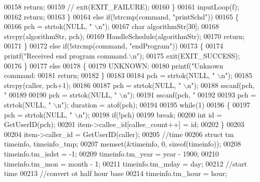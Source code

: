 \begin{DoxyCode}
{{{00158             \textcolor{keywordflow}{return};
00159             \textcolor{comment}{// exit(EXIT\_FAILURE);}
00160         \}
00161         inputLoop(f);
00162         \textcolor{keywordflow}{return};
00163     \}
00164     \textcolor{keywordflow}{else} \textcolor{keywordflow}{if}(!strcmp(command, \textcolor{stringliteral}{"printSchd"}))
00165     \{
00166         pch = strtok(NULL, \textcolor{stringliteral}{" \(\backslash\)n"});
00167         \textcolor{keywordtype}{char} algorithmStr[30];
00168         strcpy(algorithmStr, pch);
00169         HandleSchedule(algorithmStr);
00170         \textcolor{keywordflow}{return};
00171     \}
00172     \textcolor{keywordflow}{else} \textcolor{keywordflow}{if}(!strcmp(command, \textcolor{stringliteral}{"endProgram"}))
00173     \{
00174         printf(\textcolor{stringliteral}{"Received end program command.\(\backslash\)n"});
00175         exit(EXIT\_SUCCESS);
00176     \}
00177     \textcolor{keywordflow}{else}
00178     \{
00179         UNKNOWN:
00180         printf(\textcolor{stringliteral}{"Unknown command: %
00181         \textcolor{keywordflow}{return};
00182     \}
00183 
00184     pch = strtok(NULL, \textcolor{stringliteral}{" \(\backslash\)n"});
00185     strcpy(caller, pch+1);
00186 
00187     pch = strtok(NULL, \textcolor{stringliteral}{" \(\backslash\)n"});
00188     sscanf(pch, \textcolor{stringliteral}{"%
00189     
00190     pch = strtok(NULL, \textcolor{stringliteral}{" \(\backslash\)n"});
00191     sscanf(pch, \textcolor{stringliteral}{"%
00192     
00193     pch = strtok(NULL, \textcolor{stringliteral}{" \(\backslash\)n"}); duration = atof(pch);
00194 
00195     \textcolor{keywordflow}{while}(1)
00196     \{
00197         pch = strtok(NULL, \textcolor{stringliteral}{" \(\backslash\)n"});
00198         \textcolor{keywordflow}{if}(!pch)
00199             \textcolor{keywordflow}{break};
00200         \textcolor{keywordtype}{int} \textcolor{keywordtype}{id} = GetUserID(pch);
00201         item->callee_id[callee\_count++] = id;
00202     \}
00203 
00204     item->caller_id = GetUserID(caller);
00205     \textcolor{comment}{//time}
00206     \textcolor{keyword}{struct }tm timeinfo, timeinfo\_tmp;
00207     memset(&timeinfo, 0, \textcolor{keyword}{sizeof}(timeinfo));
00208     timeinfo.tm\_isdst = -1;
00209     timeinfo.tm\_year = year - 1900;
00210     timeinfo.tm\_mon = month - 1;
00211     timeinfo.tm\_mday = day;
00212     \textcolor{comment}{//start time}
00213     \textcolor{comment}{//convert ot half hour base}
00214     timeinfo.tm\_hour = hour;
}}}}}}
\end{DoxyCode}
